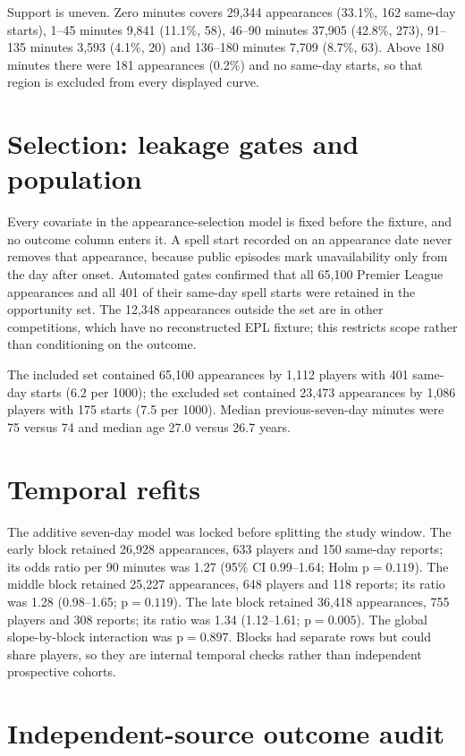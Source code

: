 \documentclass[11pt]{article}
\newcommand{\pval}{\mathrm{p}}
\begin{document}
Support is uneven. Zero minutes covers 29,344 appearances (33.1\%, 162 same-day starts), 1--45 minutes 9,841 (11.1\%, 58), 46--90 minutes 37,905 (42.8\%, 273), 91--135 minutes 3,593 (4.1\%, 20) and 136--180 minutes 7,709 (8.7\%, 63). Above 180 minutes there were 181 appearances (0.2\%) and no same-day starts, so that region is excluded from every displayed curve.

\section{Selection: leakage gates and population}

Every covariate in the appearance-selection model is fixed before the fixture, and no outcome column enters it. A spell start recorded on an appearance date never removes that appearance, because public episodes mark unavailability only from the day after onset. Automated gates confirmed that all 65,100 Premier League appearances and all 401 of their same-day spell starts were retained in the opportunity set. The 12,348 appearances outside the set are in other competitions, which have no reconstructed EPL fixture; this restricts scope rather than conditioning on the outcome.

The included set contained 65,100 appearances by 1,112 players with 401 same-day starts (6.2 per 1000); the excluded set contained 23,473 appearances by 1,086 players with 175 starts (7.5 per 1000). Median previous-seven-day minutes were 75 versus 74 and median age 27.0 versus 26.7 years.

\section{Temporal refits}

The additive seven-day model was locked before splitting the study window. The early block retained 26,928 appearances, 633 players and 150 same-day reports; its odds ratio per 90 minutes was 1.27 (95\% CI 0.99--1.64; Holm $\pval=0.119$). The middle block retained 25,227 appearances, 648 players and 118 reports; its ratio was 1.28 (0.98--1.65; $\pval=0.119$). The late block retained 36,418 appearances, 755 players and 308 reports; its ratio was 1.34 (1.12--1.61; $\pval=0.005$). The global slope-by-block interaction was $\pval=0.897$. Blocks had separate rows but could share players, so they are internal temporal checks rather than independent prospective cohorts.

\section{Independent-source outcome audit}
\end{document}
